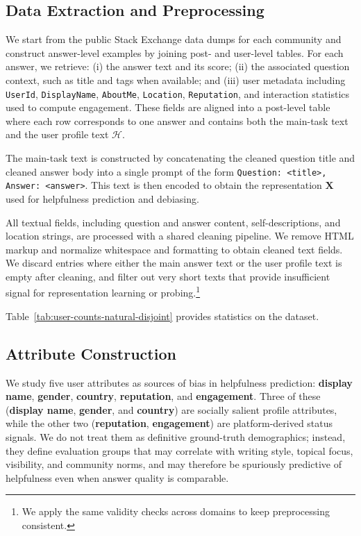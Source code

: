 \documentclass[11pt]{article}
\newcommand{\rv}[1]{\mathbf{#1}}
\begin{document}
\subsection{Data Extraction and Preprocessing}
\label{app:preprocessing-details}



We start from the public Stack Exchange data dumps for each community and construct answer-level examples by joining post- and user-level tables. For each answer, we retrieve: (i) the answer text and its score; (ii) the associated question context, such as title and tags when available; and (iii) user metadata including \texttt{UserId}, \texttt{DisplayName}, \texttt{AboutMe}, \texttt{Location}, \texttt{Reputation}, and interaction statistics used to compute engagement. These fields are aligned into a post-level table where each row corresponds to one answer and contains both the main-task text and the user profile text $\mathcal{H}$.

The main-task text is constructed by concatenating the cleaned question title and cleaned answer body into a single prompt of the form \texttt{Question: <title>, Answer: <answer>}. This text is then encoded to obtain the representation $\rv{X}$ used for helpfulness prediction and debiasing.

All textual fields, including question and answer content, self-descriptions, and location strings, are processed with a shared cleaning pipeline. We remove HTML markup and normalize whitespace and formatting to obtain cleaned text fields. We discard entries where either the main answer text or the user profile text is empty after cleaning, and filter out very short texts that provide insufficient signal for representation learning or probing.\footnote{We apply the same validity checks across domains to keep preprocessing consistent.}

Table~\ref{tab:user-counts-natural-disjoint} provides statistics on the dataset.



\subsection{Attribute Construction}
\label{app:attribute-details}


We study five user attributes as sources of bias in helpfulness prediction: \textbf{display name}, \textbf{gender}, \textbf{country}, \textbf{reputation}, and \textbf{engagement}. Three of these (\textbf{display name}, \textbf{gender}, and \textbf{country}) are socially salient profile attributes, while the other two (\textbf{reputation}, \textbf{engagement}) are platform-derived status signals. We do not treat them as definitive ground-truth demographics; instead, they define evaluation groups that may correlate with writing style, topical focus, visibility, and community norms, and may therefore be spuriously predictive of helpfulness even when answer quality is comparable.
\end{document}
